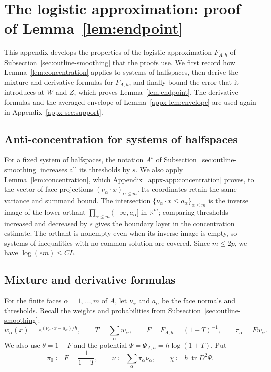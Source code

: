 \documentclass[11pt,letterpaper]{article}
\theoremstyle{remark}
\newcommand{\R}{\mathbb R}
\newcommand{\tr}{\operatorname{tr}}
\begin{document}
\section{\texorpdfstring{The logistic approximation: proof of Lemma~\ref{lem:endpoint}}{The logistic approximation: proof of Lemma 2}}\label{appx-sec:smoothing}

This appendix develops the properties of the logistic
approximation \(F_{A,h}\) of Subsection~\ref{sec:outline-smoothing} that
the proofs use. We first record how Lemma~\ref{lem:concentration}
applies to systems of halfspaces, then derive the mixture and derivative
formulas for \(F_{A,h}\), and finally bound the error that it introduces
at \(W\) and \(Z\), which proves Lemma~\ref{lem:endpoint}. The
derivative formulas and the averaged envelope of
Lemma~\ref{appx-lem:envelope} are used again in
Appendix~\ref{appx-sec:support}.

\subsection{\texorpdfstring{Anti-concentration for systems of halfspaces}{Anti-concentration for systems of halfspaces}}

For a fixed system of halfspaces, the notation
\(A^{s}\) of Subsection~\ref{sec:outline-smoothing} increases all its
thresholds by \(s\). We also apply Lemma~\ref{lem:concentration},
which Appendix~\ref{appx-app:concentration} proves, to the
vector of face projections
\((\nu_\alpha\cdot x)_{\alpha\le m}\). Its coordinates retain
the same variance and summand bound. The intersection
\(\{\nu_\alpha\cdot x\le a_\alpha\}_{\alpha\le m}\) is the inverse
image of the lower orthant \(\prod_{\alpha\le m}(-\infty,a_\alpha]\)
in \(\R^m\); comparing thresholds increased and decreased by \(s\)
gives the boundary layer in the concentration estimate. The orthant is nonempty even when
its inverse image is empty, so systems of inequalities with no
common solution are covered. Since \(m\le2p\), we have \(\log(em)\le CL\).

\subsection{\texorpdfstring{Mixture and derivative formulas}{Mixture and derivative formulas}}\label{appx-sec:mixture}

For the finite faces \(\alpha=1,\ldots,m\) of \(A\), let
\(\nu_\alpha\) and \(a_\alpha\) be the face normals and thresholds.
Recall the weights and probabilities from
Subsection~\ref{sec:outline-smoothing}:
\[
 w_\alpha(x)=e^{(\nu_\alpha\cdot x-a_\alpha)/h},\qquad
 T=\sum_\alpha w_\alpha,\qquad F=F_{A,h}=(1+T)^{-1},\qquad
 \pi_\alpha=Fw_\alpha.
\]
We also use \(\theta=1-F\) and the potential
\(\Psi=\Psi_{A,h}=h\log(1+T)\). Put
\[
 \pi_0\coloneqq F=\frac1{1+T},\qquad
 \bar\nu\coloneqq \sum_\alpha\pi_\alpha\nu_\alpha,
 \qquad \chi\coloneqq h\,\tr D^2\Psi.
\]
\end{document}
